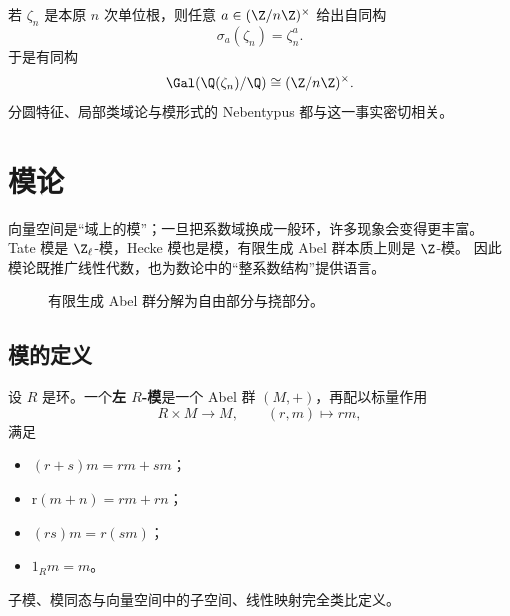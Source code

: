 \begin{example}[分圆域]
若 $\zeta_n$ 是本原 $n$ 次单位根，则任意 $a\in (\Z/n\Z)^\times$ 给出自同构
\[
  \sigma_a(\zeta_n)=\zeta_n^a.
\]
于是有同构
\begin{equation}
  \Gal(\Q(\zeta_n)/\Q)\cong (\Z/n\Z)^\times.
\end{equation}
分圆特征、局部类域论与模形式的 Nebentypus 都与这一事实密切相关。
\end{example}

\section{模论}
\label{sec:app-module-theory}

向量空间是“域上的模”；一旦把系数域换成一般环，许多现象会变得更丰富。
Tate 模是 $\Z_\ell$-模，Hecke 模也是模，有限生成 Abel 群本质上则是 $\Z$-模。
因此模论既推广线性代数，也为数论中的“整系数结构”提供语言。

\begin{figure}[H]
\centering
{}
\caption{有限生成 Abel 群分解为自由部分与挠部分。}
\end{figure}

\subsection{模的定义}

\begin{definition}[左模]
设 $R$ 是环。一个\textbf{左 $R$-模}是一个 Abel 群 $(M,+)$，再配以标量作用
\[
  R\times M\to M,
  \qquad (r,m)\mapsto rm,
\]
满足
\begin{itemize}
  \item $(r+s)m=rm+sm$；
  \item r$(m+n)=rm+rn$；
  \item $(rs)m=r(sm)$；
  \item $1_Rm=m$。
\end{itemize}
子模、模同态与向量空间中的子空间、线性映射完全类比定义。
\end{definition}

